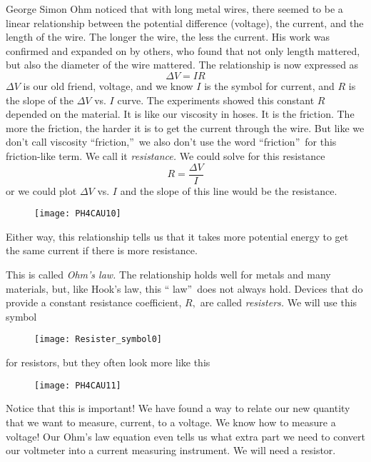 George Simon Ohm noticed that with long metal wires, there seemed to be a
linear relationship between the potential difference (voltage), the current,
and the length of the wire. The longer the wire, the less the current. His
work was confirmed and expanded on by others, who found that not only length
mattered, but also the diameter of the wire mattered. The relationship is
now expressed as%
\begin{equation*}
\Delta V=IR
\end{equation*}%
$\Delta V$ is our old friend, voltage, and we know $I$ is the symbol for
current, and $R$ is the slope of the $\Delta V$ vs. $I$ curve. The
experiments showed this constant $R$ depended on the material. It is like
our viscosity in hoses. It is the friction. The more the friction, the
harder it is to get the current through the wire. But like we don't call
viscosity \textquotedblleft friction,\textquotedblright\ we also don't use
the word \textquotedblleft friction\textquotedblright\ for this
friction-like term. We call it \emph{resistance.} We could solve for this
resistance 
\begin{equation*}
R=\frac{\Delta V}{I}
\end{equation*}%
or we could plot $\Delta V$ vs. $I$ and the slope of this line would be the
resistance.\begin{figure}[h!]
\texttt{[image: PH4CAU10]}
\end{figure}Either way, this relationship
tells us that it takes more potential energy to get the same current if
there is more resistance.

This is called \emph{Ohm's law.} The relationship holds well for metals and
many materials, but, like Hook's law, this \textquotedblleft
law\textquotedblright\ does not always hold. Devices that do provide a
constant resistance coefficient, $R,$ are called \emph{resisters. }We will
use this symbol

\begin{figure}[h!]
\texttt{[image: Resister\_symbol0]}
\end{figure}for resistors, but they
often look more like this\begin{figure}[h!]
\texttt{[image: PH4CAU11]}
\end{figure}

Notice that this is important! We have found a way to relate our new
quantity that we want to measure, current, to a voltage. We know how to
measure a voltage! Our Ohm's law equation even tells us what extra part we
need to convert our voltmeter into a current measuring instrument. We will
need a resistor.

